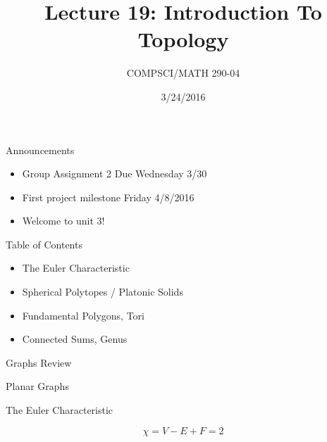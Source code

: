\documentclass{beamer}
\title{Lecture 19: Introduction To Topology}
\date{3/24/2016}
\institute{Chris Tralie, Duke University}
\author{COMPSCI/MATH 290-04}
\begin{document}
\frame{\titlepage}

\begin{frame}{Announcements}
\begin{itemize}[label=$\vartriangleright$]

\item Group Assignment 2 Due Wednesday 3/30

\item First project milestone Friday 4/8/2016

\item Welcome to unit 3!

\end{itemize}

\end{frame}

\begin{frame}{Table of Contents}
\begin{itemize}[label=$\blacktriangleright$]
	\item The Euler Characteristic
\end{itemize}
\begin{itemize}[label=$\vartriangleright$]
	\item Spherical Polytopes / Platonic Solids
\end{itemize}
\begin{itemize}[label=$\vartriangleright$]
	\item Fundamental Polygons, Tori
\end{itemize}
\begin{itemize}[label=$\vartriangleright$]
	\item Connected Sums, Genus
\end{itemize}
\end{frame}

\begin{frame}{Graphs Review}


\end{frame}


\begin{frame}{Planar Graphs}



\end{frame}


\begin{frame}{The Euler Characteristic}


 {
\[ \chi = V - E + F = 2 \]
}





\end{frame}
\end{document}
